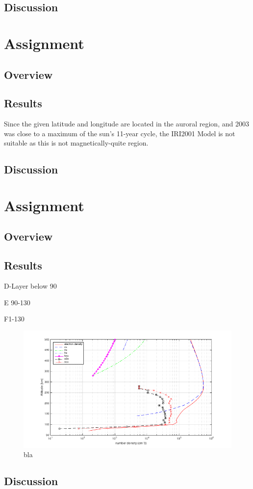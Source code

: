 \subsection{Discussion}



\section{Assignment}
\subsection{Overview}
\subsection{Results}
Since the given latitude and longitude are located in the auroral region, and 2003 was close to a maximum of the sun's 11-year cycle, the IRI2001 Model is not suitable as this is not magnetically-quite region.
\subsection{Discussion}



\section{Assignment}
\subsection{Overview}
\subsection{Results}
D-Layer below 90

E 90-130

F1-130
\begin{figure}[h]
	\centering
	\includegraphics[width=\linewidth]{images/ass5_properties_plot}	
	\caption{bla}
	\label{fig:ass5Plot}
\end{figure}


\subsection{Discussion}

